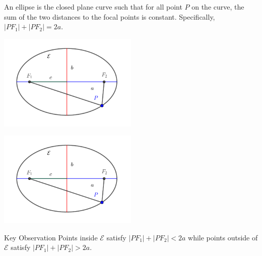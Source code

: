 \documentclass[compress,aspectratio=169,10pt,usenames,dvipsnames]{beamer}
\begin{document}

\begin{frame}

\vfill

\begin{definition}
An ellipse is the closed plane curve such that for all point $P$ on the curve, the sum of the two distances to the focal points is constant. Specifically, $|PF_1| + |PF_2| = 2a$. 
\end{definition}

\vfill

\begin{center}
\includegraphics[width=0.5\textwidth]{EllipseAlt}
\end{center}

\vfill

\end{frame}


\begin{frame}

\vfill

\begin{center}
\includegraphics[width=0.5\textwidth]{EllipseAlt}
\end{center}

\vfill

\begin{block}{Key Observation}
Points inside $\mathcal{E}$ satisfy $|PF_1| + |PF_2| < 2a$ while points outside of $\mathcal{E}$ satisfy $|PF_1| + |PF_2| > 2a$. 
\end{block}

\vfill

\end{frame}
\end{document}
